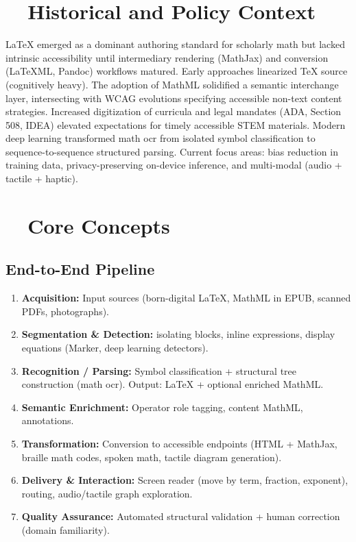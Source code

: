 \section{~~Historical and Policy Context}\label{ch11:sec:history-policy}
LaTeX emerged as a dominant authoring standard for scholarly math but lacked intrinsic accessibility until intermediary rendering (MathJax) and conversion (LaTeXML, Pandoc) workflows matured.\supercite{LaTeXProject, Pandoc} Early  approaches linearized TeX source (cognitively heavy). The adoption of \gls{MathML} solidified a semantic interchange layer, intersecting with WCAG evolutions specifying accessible non-text content strategies.\supercite{WCAG21W3C2018} Increased digitization of curricula and legal mandates (ADA, Section 508, IDEA)\supercite{ADA1990, Section508, IDEA2004} elevated expectations for timely accessible STEM materials. Modern deep learning transformed math \gls{ocr} from isolated symbol classification to sequence-to-sequence structured parsing.\supercite{ArxivMER2203, ArxivMER2303} Current focus areas: bias reduction in training data, privacy-preserving on-device inference, and multi-modal  (audio + tactile + haptic).

\section{~~Core Concepts}\label{ch11:sec:core-concepts}

\subsection{End-to-End  Pipeline}
\begin{enumerate}
	\item \textbf{Acquisition:} Input sources (born-digital LaTeX, \gls{MathML} in EPUB, scanned PDFs, photographs).
	\item \textbf{Segmentation \& Detection:}  isolating blocks, inline expressions, display equations (Marker, deep learning detectors).\supercite{MarkerDocs}
	\item \textbf{Recognition / Parsing:} Symbol classification + structural tree construction (math \gls{ocr}). Output: LaTeX + optional enriched \gls{MathML}.
	\item \textbf{Semantic Enrichment:} Operator role tagging, content MathML,  annotations.\supercite{IBMSemanticAI}
	\item \textbf{Transformation:} Conversion to accessible endpoints (HTML + MathJax, braille math codes, spoken math, tactile diagram generation).
	\item \textbf{Delivery \& Interaction:} Screen reader  (move by term, fraction, exponent),  routing, audio/tactile graph exploration.\supercite{DesmosAccessibility, ViewPlusAGC}
	\item \textbf{Quality Assurance:} Automated structural validation + human correction (domain familiarity).
\end{enumerate}

